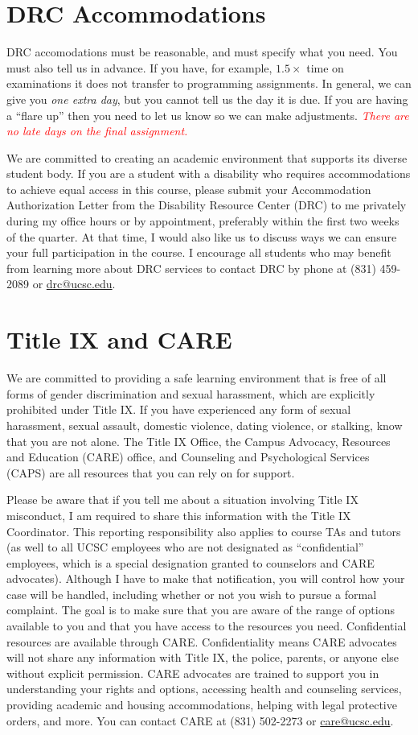 \documentclass{article}
\begin{document}
\section{DRC Accommodations}
DRC accomodations must be reasonable, and must specify what you
need. You must also tell us in advance. If you have, for example,
$1.5\times$ time on examinations it does not transfer to programming
assignments. In general, we can give you \emph{one extra day}, but
you cannot tell us the day it is due. If you are having a ``flare
up'' then you need to let us know so we can make adjustments.
\textcolor{red}{\emph{There are no late days on the final assignment.}}

We are committed to creating an academic environment that
supports its diverse student body. If you are a student with a
disability who requires accommodations to achieve equal access in
this course, please submit your Accommodation Authorization Letter
from the Disability Resource Center (DRC) to me privately during
my office hours or by appointment, preferably within the first two
weeks of the quarter. At that time, I would also like us to discuss
ways we can ensure your full participation in the course. I encourage
all students who may benefit from learning more about DRC services
to contact DRC by phone at (831) 459-2089 or \url{drc@ucsc.edu}.

\section{Title IX and CARE}
We are committed to providing a safe learning environment
that is free of all forms of gender discrimination and sexual
harassment, which are explicitly prohibited under Title IX. If you
have experienced any form of sexual harassment, sexual assault,
domestic violence, dating violence, or stalking, know that you are
not alone. The Title IX Office, the Campus Advocacy, Resources and
Education (CARE) office, and Counseling and Psychological Services
(CAPS) are all resources that you can rely on for support.

Please be aware that if you tell me about a situation involving Title IX
misconduct, I am required to share this information with the Title IX
Coordinator. This reporting responsibility also applies to course TAs and tutors
(as well to all UCSC employees who are not designated as ``confidential''
employees, which is a special designation granted to counselors and CARE
advocates). Although I have to make that notification, you will control how your
case will be handled, including whether or not you wish to pursue a formal
complaint. The goal is to make sure that you are aware of the range of options
available to you and that you have access to the resources you need.
Confidential resources are available through CARE. Confidentiality means CARE
advocates will not share any information with Title IX, the police, parents, or
anyone else without explicit permission.  CARE advocates are trained to support
you in understanding your rights and options, accessing health and counseling
services, providing academic and housing accommodations, helping with legal
protective orders, and more. You can contact CARE at (831) 502-2273 or
\url{care@ucsc.edu}.
\end{document}
